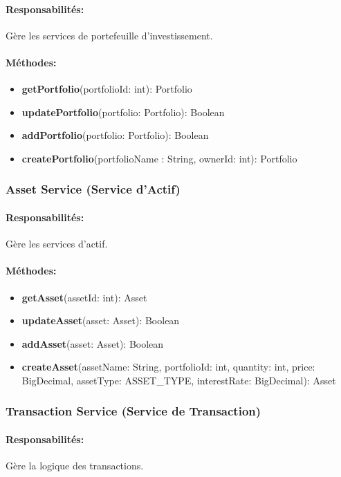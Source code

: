 \documentclass{article}
\begin{document}
\paragraph{Responsabilités:} Gère les services de portefeuille d'investissement.
\paragraph{Méthodes:}
\begin{itemize}
  \item \textbf{getPortfolio}(portfolioId: int): Portfolio
  \item \textbf{updatePortfolio}(portfolio: Portfolio): Boolean
  \item \textbf{addPortfolio}(portfolio: Portfolio): Boolean
  \item \textbf{createPortfolio}(portfolioName : String, ownerId: int): Portfolio
\end{itemize}
\subsubsection{Asset Service (Service d'Actif)}
\paragraph{Responsabilités:} Gère les services d'actif.
\paragraph{Méthodes:}
\begin{itemize}
  \item \textbf{getAsset}(assetId: int): Asset
  \item \textbf{updateAsset}(asset: Asset): Boolean
  \item \textbf{addAsset}(asset: Asset): Boolean
  \item \textbf{createAsset}(assetName: String, portfolioId: int, quantity: int,
  price: BigDecimal, assetType: ASSET\_TYPE,  interestRate: BigDecimal): Asset
\end{itemize}

\subsubsection{Transaction Service (Service de Transaction)}
\paragraph{Responsabilités:} Gère la logique des transactions.
\end{document}
